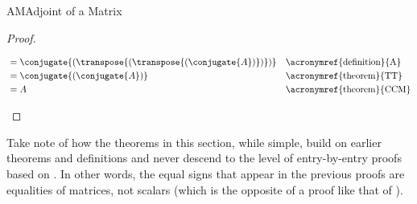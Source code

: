 \begin{subsect}{AM}{Adjoint of a Matrix}
\begin{proof}
\begin{para}
\begin{align*}
%
&=\conjugate{\left(\transpose{\left(\transpose{\left(\conjugate{A}\right)}\right)}\right)}
&&\text{\acronymref{definition}{A}}\\
%
&=\conjugate{\left(\conjugate{A}\right)}
&&\text{\acronymref{theorem}{TT}}\\
%
&=A
&&\text{\acronymref{theorem}{CCM}}
%
\end{align*}
\end{para}
%
\end{proof}
%
\begin{para}Take note of how the theorems in this section, while simple, build on earlier theorems and definitions and never descend to the level of entry-by-entry proofs based on .  In other words, the equal signs that appear in the previous proofs are equalities of matrices, not scalars (which is the opposite of a proof like that of ).\end{para}
%
%
\end{subsect}
%



